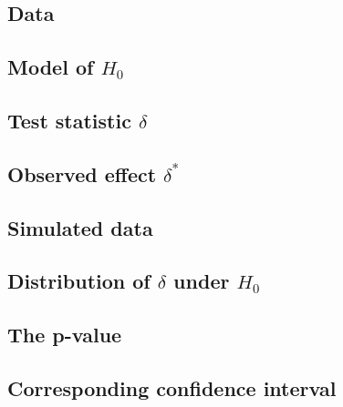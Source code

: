 \documentclass[
  12pt, krantz2,
]{krantz}
\begin{document}
\hypertarget{data}{%
\subsection{Data}\label{data}}

\hypertarget{model-of-h_0}{%
\subsection{\texorpdfstring{Model of \(H_0\)}{Model of H\_0}}\label{model-of-h_0}}

\hypertarget{test-statistic-delta}{%
\subsection{\texorpdfstring{Test statistic \(\delta\)}{Test statistic \textbackslash delta}}\label{test-statistic-delta}}

\hypertarget{observed-effect-delta}{%
\subsection{\texorpdfstring{Observed effect \(\delta^*\)}{Observed effect \textbackslash delta\^{}*}}\label{observed-effect-delta}}

\hypertarget{simulated-data}{%
\subsection{Simulated data}\label{simulated-data}}

\hypertarget{distribution-of-delta-under-h_0}{%
\subsection{\texorpdfstring{Distribution of \(\delta\) under \(H_0\)}{Distribution of \textbackslash delta under H\_0}}\label{distribution-of-delta-under-h_0}}

\hypertarget{the-p-value}{%
\subsection{The p-value}\label{the-p-value}}

\hypertarget{corresponding-confidence-interval-1}{%
\subsection{Corresponding confidence interval}\label{corresponding-confidence-interval-1}}
\end{document}
